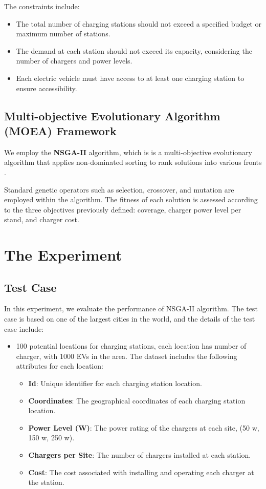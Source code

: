 \documentclass[12pt]{report}
\begin{document}
The constraints include:
\begin{itemize}
    \item The total number of charging stations should not exceed a specified budget or maximum number of stations.
    \item The demand at each station should not exceed its capacity, considering the number of chargers and power levels.
    \item Each electric vehicle must have access to at least one charging station to ensure accessibility.
\end{itemize}

\section{Multi-objective Evolutionary Algorithm (MOEA) Framework}
We employ the \textbf{NSGA-II} algorithm, which is  is a multi-objective evolutionary algorithm that applies non-dominated sorting to rank solutions into various fronts \cite{ref8}.

Standard genetic operators such as selection, crossover, and mutation are employed within the algorithm. The fitness of each solution is assessed according to the three objectives previously defined: coverage, charger power level per stand, and charger cost.

\chapter{The Experiment}

\section{Test Case}
In this experiment, we evaluate the performance of NSGA-II algorithm. The test case is based on one of the largest cities in the world, and the details of the test case include:

\begin{itemize}
    \item 100 potential locations for charging stations, each location has number of charger, with 1000 EVs in the area. The dataset includes the following attributes for each location:
    \begin{itemize}
        \item \textbf{Id}: Unique identifier for each charging station location.
        \item \textbf{Coordinates}: The geographical coordinates of each charging station location.
        \item \textbf{Power Level (W)}: The power rating of the chargers at each site, (50 w, 150 w, 250 w).
        \item \textbf{Chargers per Site}: The number of chargers installed at each station.
        \item \textbf{Cost}: The cost associated with installing and operating each charger at the station.
    \end{itemize}
\end{itemize}
\end{document}
